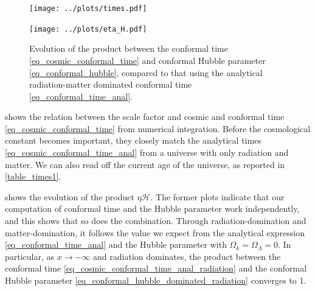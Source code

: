 \documentclass[10pt,a4paper]{article}
\begin{document}
\begin{figure}
	\centering
	\texttt{[image: ../plots/times.pdf]}
	\caption{%
		Evolution of numerically integrated cosmic and conformal times \eqref{eq_cosmic_conformal_time} in the Planck 2018 cosmology \eqref{eq_planck2018},
		compared to the analytical expressions \eqref{eq_cosmic_conformal_time_anal} in a universe with no cosmological constant.
	}
	\label{fig_cosmic_conformal_time}

	\bigskip

	\texttt{[image: ../plots/eta\_H.pdf]}
	\caption{%
		Evolution of the product between the conformal time \eqref{eq_cosmic_conformal_time} and conformal Hubble parameter \eqref{eq_conformal_hubble},
		compared to that using the analytical radiation-matter dominated conformal time \eqref{eq_conformal_time_anal}.
	}
	\label{fig_eta_H}
\end{figure}

 shows the relation between the scale factor and cosmic and conformal time \eqref{eq_cosmic_conformal_time} from numerical integration.
Before the cosmological constant becomes important, they closely match the analytical times \eqref{eq_cosmic_conformal_time_anal} from a universe with only radiation and matter.
We can also read off the current age of the universe, as reported in \cref{table_times1}.

 shows the evolution of the product $\eta \mathcal{H}$.
The former plots indicate that our computation of conformal time and the Hubble parameter work independently,
and this shows that so does the combination.
Through radiation-domination and matter-domination,
it follows the value we expect from the analytical expression \eqref{eq_conformal_time_anal}
and the Hubble parameter with $\Omega_{k} = \Omega_\Lambda = 0$.
In particular, as $x \rightarrow -\infty$ and radiation dominates,
the product between the conformal time \eqref{eq_cosmic_conformal_time_anal_radiation}
and the conformal Hubble parameter \eqref{eq_conformal_hubble_dominated_radiation} converges to 1.
\end{document}
